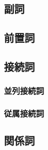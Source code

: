 \documentclass[a4paper,xelatex,ja=standard]{bxjsarticle}
\begin{document}
\subsection{副詞}
\subsection{前置詞}
\subsection{接続詞}
\subsubsection{並列接続詞}
\subsubsection{従属接続詞}
\subsection{関係詞}
\end{document}
